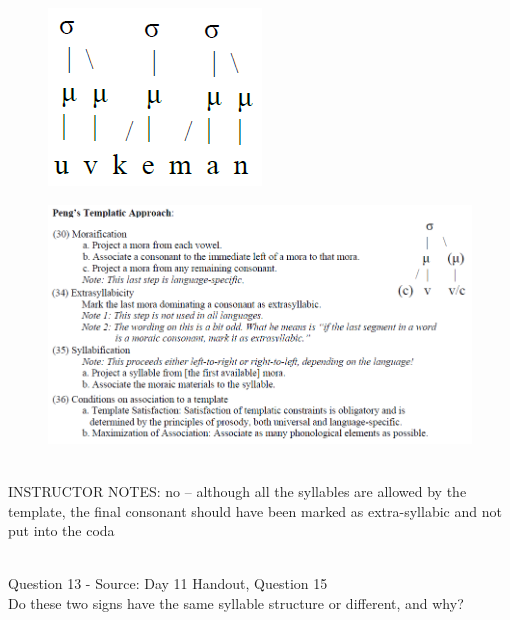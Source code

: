 \documentclass[12pt]{article}
\begin{document}
\begin{figure}[H]
\includegraphics{../images/pengtemplate_uvkeman_no.png}
\end{figure}
\begin{figure}[H]
\includegraphics{../images/peng_template_withdiagram.png}
\end{figure}

~\\
INSTRUCTOR NOTES: no -- although all the syllables are allowed by the template, the final consonant should have been marked as extra-syllabic and not put into the coda


~\\

{\large Question 13} - Source: Day 11 Handout, Question 15\\

Do these two signs have the same syllable structure or different, and why?\\
\end{document}
